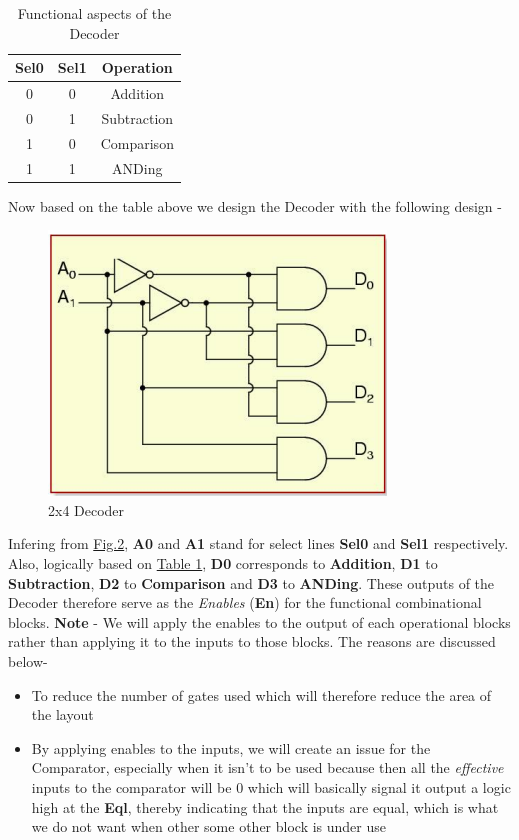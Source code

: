 \documentclass[a4paper, titlepage]{article}
\begin{document}
\begin{table}[h]
\begin{center} 
\hypertarget{dec_tab}{
\begin{tabular}{|c|c|c|}
    \hline 
    \textbf{Sel0} & \textbf{Sel1} & \textbf{Operation} \\
    \hline
    0 & 0 & Addition \\
    \hline 
    0 & 1 & Subtraction \\
    \hline 
    1 & 0 & Comparison \\
    \hline 
    1 & 1 & ANDing \\
    \hline
\end{tabular}}
\caption{Functional aspects of the Decoder}
\label{tab:t1}
\end{center}
\end{table}
Now based on the table above we design the Decoder with the following design - 
\begin{figure}[htp]
    \centering
    \hypertarget{Dec}{\includegraphics[scale = 0.6]{Image_Decoder.png}}
    \caption{2x4 Decoder}
    \label{fig:fig1}
\end{figure}

Infering from \hyperlink{Dec}{Fig.2}, \textbf{A0} and \textbf{A1} stand for select lines \textbf{Sel0}
and \textbf{Sel1} respectively. Also, logically based on \hyperlink{dec_tab}{Table 1}, \textbf{D0} 
corresponds to \textbf{Addition}, \textbf{D1} to \textbf{Subtraction}, \textbf{D2} to \textbf{Comparison} and 
\textbf{D3} to \textbf{ANDing}. These outputs of the Decoder therefore serve as the \textit{Enables} (\textbf{En}) 
for the functional combinational blocks. \newline 
\textbf{Note} - We will apply the enables to the output of each operational blocks rather than applying it 
to the inputs to those blocks. The reasons are discussed below-
\begin{itemize}
    \item To reduce the number of gates used which will therefore reduce the area of the layout 
    \item By applying enables to the inputs, we will create an issue for the Comparator, especially when it isn't to 
    be used because then all the \textit{effective} inputs to the comparator will be 0 which will basically signal it 
    output a logic high at the \textbf{Eql}, thereby indicating that the inputs are equal, which is what we do not want 
    when other some other block is under use
\end{itemize}
\end{document}
